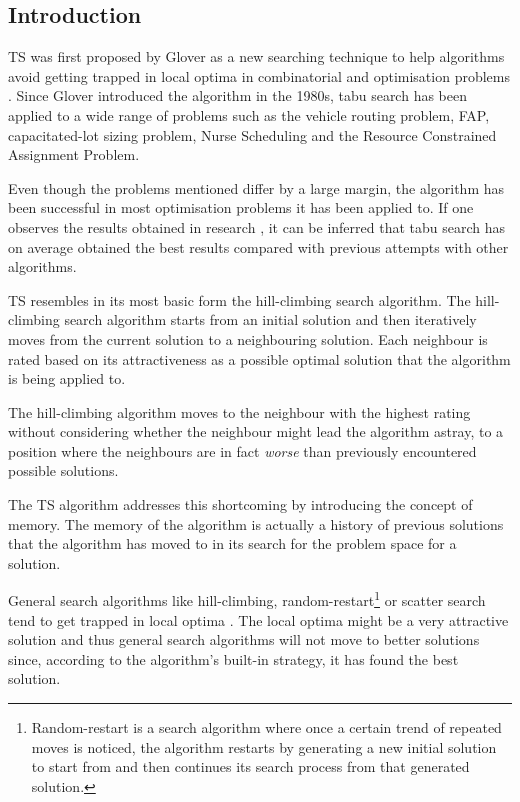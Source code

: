\subsection{Introduction}
\label{sec:TSIntroduction}
\gls{TS} was first proposed by Glover\cite{Glover89} as a new searching technique to help algorithms avoid getting trapped in local optima in combinatorial and optimisation problems \cite{TabuRCAProblem}. Since Glover introduced the algorithm in the 1980s, tabu search has been applied to a wide range of problems such as the vehicle routing problem\cite{TabuVechicleRoutingWithTimeWindows}, \gls{FAP}\cite{TabuMontemanniSmith}, capacitated-lot sizing problem\cite{TabuCarryOver}, Nurse Scheduling\cite{TabuNurse} and the Resource Constrained Assignment Problem\cite{TabuRCAProblem}. 

Even though the problems mentioned differ by a large margin, the algorithm has been successful in most optimisation problems it has been applied to. If one observes the results obtained in research \cite{TabuMontemanniSmith,tabuglobalplanning3g}, it can be inferred that tabu search has on average obtained the best results compared with previous attempts with other algorithms. 

\gls{TS} resembles in its most basic form the hill-climbing search algorithm\cite{TabuBiddingStrats}. The hill-climbing search algorithm starts from an initial solution and then iteratively moves from the current solution to a neighbouring solution\cite{AIModernApproach}. Each neighbour is rated based on its attractiveness as a possible optimal solution that the algorithm is being applied to\cite{AIModernApproach}. 

The hill-climbing algorithm moves to the neighbour with the highest rating without considering whether the neighbour might lead the algorithm astray, to a position where the neighbours are in fact \emph{worse} than previously encountered possible solutions\cite{AIModernApproach}. 

The \gls{TS} algorithm addresses this shortcoming by introducing the concept of memory\cite{TabuBiddingStrats}. The memory of the algorithm is actually a history of previous solutions that the algorithm has moved to in its search for the problem space for a solution\cite{TabuBiddingStrats}. 

General search algorithms like hill-climbing, random-restart\footnote{Random-restart is a search algorithm where once a certain trend of repeated moves is noticed, the algorithm restarts by generating a new initial solution to start from and then continues its search process from that generated solution\cite{AIModernApproach}.} or scatter search tend to get trapped in local optima \cite{AIModernApproach}. The local optima might be a very attractive solution and thus general search algorithms will not move to better solutions since, according to the algorithm's built-in strategy, it has found the best solution. 

